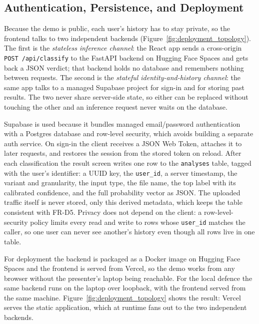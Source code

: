 \subsection{Authentication, Persistence, and Deployment}
\label{subsec:auth_persistence}

\par Because the demo is public, each user's history has to stay private, so the frontend talks to two independent backends (Figure~\ref{fig:deployment_topology}). The first is the \emph{stateless inference channel}: the React app sends a cross-origin \texttt{POST /api/classify} to the FastAPI backend on Hugging Face Spaces and gets back a JSON verdict; that backend holds no database and remembers nothing between requests. The second is the \emph{stateful identity-and-history channel}: the same app talks to a managed Supabase project for sign-in and for storing past results. The two never share server-side state, so either can be replaced without touching the other and an inference request never waits on the database.

\par Supabase is used because it bundles managed email/password authentication with a Postgres database and row-level security, which avoids building a separate auth service. On sign-in the client receives a JSON Web Token, attaches it to later requests, and restores the session from the stored token on reload. After each classification the result screen writes one row to the \texttt{analyses} table, tagged with the user's identifier: a UUID key, the \texttt{user\_id}, a server timestamp, the variant and granularity, the input type, the file name, the top label with its calibrated confidence, and the full probability vector as JSON. The uploaded traffic itself is never stored, only this derived metadata, which keeps the table consistent with FR-D5. Privacy does not depend on the client: a row-level-security policy limits every read and write to rows whose \texttt{user\_id} matches the caller, so one user can never see another's history even though all rows live in one table.

\par For deployment the backend is packaged as a Docker image on Hugging Face Spaces and the frontend is served from Vercel, so the demo works from any browser without the presenter's laptop being reachable. For the local defence the same backend runs on the laptop over loopback, with the frontend served from the same machine. Figure~\ref{fig:deployment_topology} shows the result: Vercel serves the static application, which at runtime fans out to the two independent backends.

